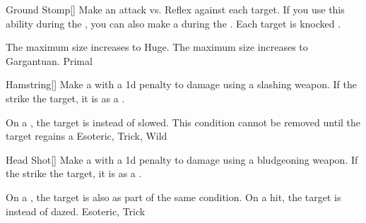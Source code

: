 \lowercase{\hypertarget{maneuver:Ground Stomp}{}}\label{maneuver:Ground Stomp}
\hypertarget{maneuver:Ground Stomp}{}
\begin{freeability}[Rank 3]{Ground Stomp}[]
Make an attack vs. Reflex against each target.
If you use this ability during the , you can also make a  during the .
\hit Each target is knocked \prone.

\rankline
{} The maximum size increases to Huge.
 The maximum size increases to Gargantuan.
 Primal
\end{freeability}
\vspace{0.25em}



\lowercase{\hypertarget{maneuver:Hamstring}{}}\label{maneuver:Hamstring}
\hypertarget{maneuver:Hamstring}{}
\begin{freeability}[Rank 3]{Hamstring}[]
Make a  with a \minus1d penalty to damage using a slashing weapon.
If the strike  the target, it is  as a .

\rankline
{} On a , the target is  instead of slowed.
 This condition cannot be removed until the target regains a 
 Esoteric, Trick, Wild
\end{freeability}
\vspace{0.25em}



\lowercase{\hypertarget{maneuver:Head Shot}{}}\label{maneuver:Head Shot}
\hypertarget{maneuver:Head Shot}{}
\begin{freeability}[Rank 3]{Head Shot}[]
Make a  with a \minus1d penalty to damage using a bludgeoning weapon.
If the strike  the target,
it is  as a .

\rankline
{} On a , the target is also  as part of the same condition.
 On a hit, the target is  instead of dazed.
 Esoteric, Trick
\end{freeability}
\vspace{0.25em}



